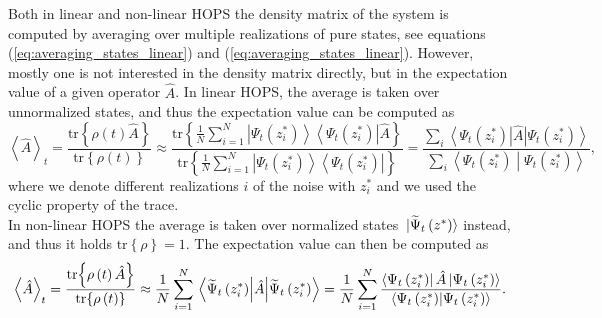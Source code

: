 Both in linear and non-linear HOPS the density matrix of the system is computed by
averaging over multiple realizations of pure states, see equations 
(\ref{eq:averaging_states_linear}) and (\ref{eq:averaging_states_linear}).
However, mostly one is not interested in the density matrix directly, but in 
the expectation value of a given operator $\hat{A}$. In linear HOPS, the average
is taken over unnormalized states, and thus the expectation value can be computed as
\begin{equation}
    \left\langle\hat{A}\right\rangle_t 
    = \frac{\text{tr}\left\{\rho\left(t\right)\hat{A}\right\}}{\text{tr}\left\{\rho\left(t\right)\right\}}
    \approx \frac{\text{tr}\left\{\frac{1}{N}\sum_{i=1}^{N}\left|\Psi_t\left(z^*_i\right)\right\rangle\left\langle\Psi_t\left(z^*_i\right)\right|\hat{A}\right\}}
    {\text{tr}\left\{\frac{1}{N}\sum_{i=1}^{N}\left|\Psi_t\left(z^*_i\right)\right\rangle\left\langle\Psi_t\left(z^*_i\right)\right|\right\}}
    = \frac{\sum_i\left\langle\Psi_t\left(z^*_i\right)\right|\hat{A}\left|\Psi_t\left(z^*_i\right)\right\rangle}
    {\sum_i\left\langle\Psi_t\left(z^*_i\right)\middle|\Psi_t\left(z^*_i\right)\right\rangle},
\end{equation}
where we denote different realizations $i$ of the noise with $z^*_i$ and we used the
cyclic property of the trace.
\\
In non-linear HOPS the average is taken over normalized states $\ket*{\widetilde{\Psi}_t\left(z^*\right)}$ instead,
and thus it holds $\text{tr}\left\{\rho\right\} = 1$. The expectation value can then be
computed as
\begin{equation}
    \left\langle\hat{A}\right\rangle_t 
    = \frac{\tr{\rho\left(t\right)\hat{A}}}{\tr{\rho\left(t\right)}}
    \approx \frac{1}{N}\sum_{i=1}^{N} \expectationvalue{\hat{A}}{\widetilde{\Psi}_t\left(z^*_i\right)}
    = \frac{1}{N}\sum_{i=1}^{N} \frac{\left\langle\Psi_t\left(z^*_i\right)\right|\hat{A}\left|\Psi_t\left(z^*_i\right)\right\rangle}
    {\left\langle\Psi_t\left(z^*_i\right)\middle|\Psi_t\left(z^*_i\right)\right\rangle}.
\end{equation}